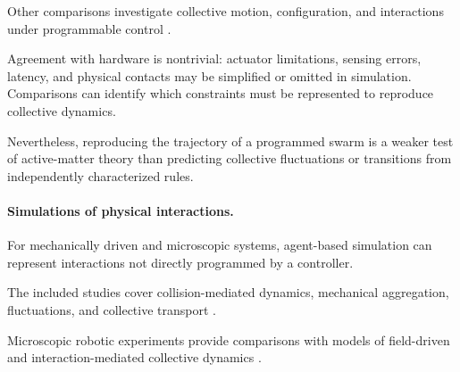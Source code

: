 Other comparisons investigate collective
motion, configuration, and interactions
under programmable control
\cite{Yamada2011circularmotiongene,Yang2023collectivechaseem,Tran2022frontierledswarmin,Giardina2022collectivephototact,Vega2023simulatelessexpec,Vega2023indirectswarmcontr,Vega2024agentbasedemulatio,Gao2023robustdistributedc,Lee2022distributedcohesive,Baumann2024hybridflockforma,Wu2024adversarialimitatio,Varadharajan2026programmableflocks,Pan2026exploringthephysic,Sankar2026trendformationwith,Verdoucq2025flockingphasetrans,Jond2026positionbasedflock}.

Agreement with hardware is nontrivial:
actuator limitations, sensing errors,
latency, and physical contacts may
be simplified or omitted in simulation.
Comparisons can identify which constraints
must be represented to reproduce
collective dynamics.

Nevertheless, reproducing the trajectory
of a programmed swarm is a weaker
test of active-matter theory than
predicting collective fluctuations
or transitions from independently
characterized rules.

\paragraph*{Simulations of physical interactions.}

For mechanically driven and microscopic
systems, agent-based simulation can
represent interactions not directly
programmed by a controller.

The included studies cover collision-mediated
dynamics, mechanical aggregation,
fluctuations, and collective transport
\cite{Welch2018aggregatesuppressio,Welch2019activereorientation,Xi2024emergentintelligenc,GuzmnLastra2026emergenceofbeating,Edwards2026robusttopologically,Musacchio2026activeembracemente,Arbel2025amechanicalroutef,Baconnier2022selectiveandcollec,Casiulis2025ageometricconditio,Deblais2018boundariescontrolc,Boudet2022effectivetemperatur,Wang2025hyperuniformnetwork,Musacchio2026fluidizationinduced,Zion2023morphologicalcomput,Wagner2026geometryinducedtra,Zion2021distributedonline}.

Microscopic robotic experiments provide
comparisons with models of field-driven
and interaction-mediated collective dynamics
\cite{Sun2021swarmingmicrodrople,Calabr2026interactiondrivena,Xie2020bioinspiredsoftmic,Pauer2021programmabledesign,Chen2024synchronousandfull,Yigit2019programmablecollect,McGovern2024multifunctionalchir,Feng2023weakionexchangeba,Sun2024multiplemagnetoopt,Liu2022bionicmorphological,Wang2018collectivebehavior,Baker2019shapeprogrammed3d,Goyal2025externallycontrolle,Aubret2018targetedassemblyan,Yan2024programmingstructur,Yigit2020cohesiveselforgani,Hanson2025electrokineticpropu,Law2024navigationofmagnet,Ceron2026fluidictorqueenabl,Li2022vectorcontrolledwh}.

